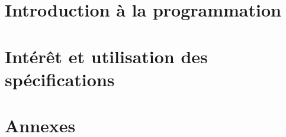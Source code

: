 \documentclass[12pt,a4paper,openany]{book}
\begin{document}
	\dominitoc
	\setcounter{tocdepth}{1}
	\setcounter{secnumdepth}{3}
	\setcounter{minitocdepth}{1}
	\maketitle
	\tableofcontents
	\part{Introduction à la programmation}
	
	
	

	\part{Intérêt et utilisation des spécifications}
	
	
	
	
	

	\appendix
	\part{Annexes}
	
	
\end{document}
